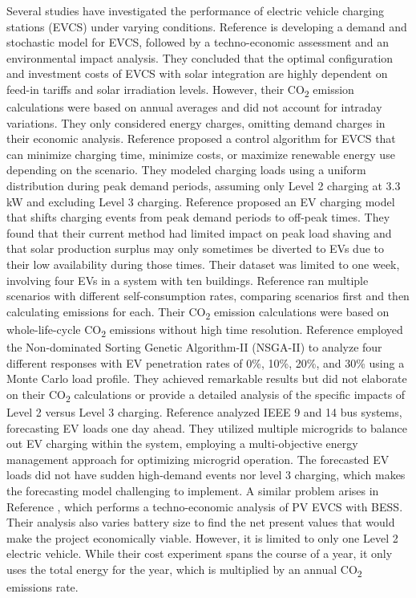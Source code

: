\documentclass[conference, usletter]{IEEEtran}
\begin{document}
Several studies have investigated the performance of electric vehicle charging stations (EVCS) under varying conditions. Reference \cite{himabindu2021analysis} is developing a demand and stochastic model for EVCS, followed by a techno-economic assessment and an environmental impact analysis. They concluded that the optimal configuration and investment costs of EVCS with solar integration are highly dependent on feed-in tariffs and solar irradiation levels. However, their CO\textsubscript{2} emission calculations were based on annual averages and did not account for intraday variations. They only considered energy charges, omitting demand charges in their economic analysis. Reference \cite{yoon2017economic} proposed a control algorithm for EVCS that can minimize charging time, minimize costs, or maximize renewable energy use depending on the scenario. They modeled charging loads using a uniform distribution during peak demand periods, assuming only Level 2 charging at 3.3 kW and excluding Level 3 charging. Reference \cite{purvins2018electric} proposed an EV charging model that shifts charging events from peak demand periods to off-peak times. They found that their current method had limited impact on peak load shaving and that solar production surplus may only sometimes be diverted to EVs due to their low availability during those times. Their dataset was limited to one week, involving four EVs in a system with ten buildings. Reference \cite{Khemir} ran multiple scenarios with different self-consumption rates, comparing scenarios first and then calculating emissions for each. Their CO\textsubscript{2} emission calculations were based on whole-life-cycle CO\textsubscript{2} emissions without high time resolution. Reference \cite{huang2023multi} employed the Non-dominated Sorting Genetic Algorithm-II (NSGA-II) to analyze four different responses with EV penetration rates of 0\%, 10\%, 20\%, and 30\% using a Monte Carlo load profile. They achieved remarkable results but did not elaborate on their CO\textsubscript{2} calculations or provide a detailed analysis of the specific impacts of Level 2 versus Level 3 charging. Reference \cite{tan2020multi} analyzed IEEE 9 and 14 bus systems, forecasting EV loads one day ahead. They utilized multiple microgrids to balance out EV charging within the system, employing a multi-objective energy management approach for optimizing microgrid operation. The forecasted EV loads did not have sudden high-demand events nor level 3 charging, which makes the forecasting model challenging to implement. A similar problem arises in Reference \cite{PV_EV_Charging_Station}, which performs a techno-economic analysis of PV EVCS with BESS. Their analysis also varies battery size to find the net present values that would make the project economically viable. However, it is limited to only one Level 2 electric vehicle. While their cost experiment spans the course of a year, it only uses the total energy for the year, which is multiplied by an annual CO\textsubscript{2} emissions rate.
\end{document}

